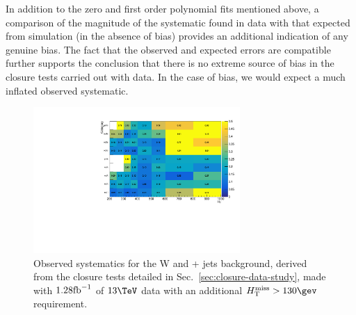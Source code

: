 In addition to
the zero and first order polynomial fits mentioned above, a comparison
of the magnitude of the systematic found in data with that expected
from simulation (\ie in the absence of bias) provides an
additional indication of any genuine bias. The fact
that the observed and expected errors are compatible further supports
the conclusion that there is no extreme source of bias in the closure
tests carried out with data. In the case of bias, we would expect a
much inflated observed systematic.

\begin{figure}[]
  \centering
  \includegraphics[width=0.7\textwidth]{figures/closureTests/1280pb/ttW/ttW_systOut_obs.pdf}
  \caption{\label{fig:systematicsObs} Observed systematics for the
  W and \ttbar + jets background, derived from
  the closure tests detailed in Sec.~\ref{sec:closure-data-study},
  made with $1.28\text{fb}^{-1}$ of $13\tev$ data with an additional
  $\mht>130\gev$ requirement.}
\end{figure}

